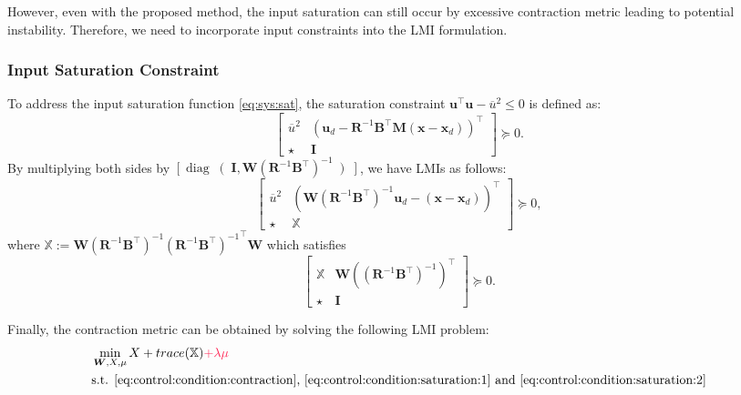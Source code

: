 \documentclass{ifacconf}
\newcommand{\ctxt}[2]{{\color{#1}{#2}\color{black}}}
\newcommand{\cred}[1]{{\ctxt{awesome}{#1}}}
\newcommand*{\mv}[1]{\boldsymbol{#1}} %
\newcommand*{\mm}[1]{\boldsymbol{#1}} %
\DeclareMathOperator{\mydiag}{diag}     %
\begin{document}
However, even with the proposed method, the input saturation can still occur by excessive contraction metric leading to potential instability.
Therefore, we need to incorporate input constraints into the LMI formulation.

\subsubsection{Input Saturation Constraint}

To address the input saturation function \eqref{eq:sys:sat}, the saturation constraint $\mv{u}^\top \mv{u} - \overline{u}^2 \le 0$ is defined as:
\begin{equation}
   \begin{bmatrix}
      \overline{u}^2 & \left(\mv{u}_d - \mm{R}^{-1}\mm{B}^\top\mm{M}(\mv{x}-\mv{x}_d)\right)^\top \\
      \star & \mm{I}
   \end{bmatrix}
   \succeq
   0
   .
\end{equation}
By multiplying both sides by $\left[\mydiag\right(\mm{I},\mm{W}(\mm{R}^{-1}\mm{B}^\top)^{-1}\left)\right]$, we have LMIs as follows:
\begin{equation} \label{eq:control:condition:saturation:1}
   \begin{bmatrix}
      \overline{u}^2 & \left(\mm{W}(\mm{R}^{-1}\mm{B}^\top)^{-1}\mv{u}_d - (\mv{x}-\mv{x}_d)\right)^\top \\
      \star & \mathbb{X}
   \end{bmatrix}
   \succeq
   0
   ,
\end{equation}
where $\mathbb{X}:=\mm{W}(\mm{R}^{-1}\mm{B}^\top)^{-1}{(\mm{R}^{-1}\mm{B}^\top)^{-1}}^\top\mm{W}$ which satisfies
\begin{equation} \label{eq:control:condition:saturation:2}
   \begin{bmatrix}
      \mathbb{X} & \mm{W}((\mm{R}^{-1}\mm{B}^\top)^{-1})^\top \\
      \star & \mm{I}
   \end{bmatrix}
   \succeq
   0
   .
\end{equation}

\hfill

Finally, the contraction metric can be obtained by solving the following LMI problem:
\begin{equation}
   \begin{aligned}
      &\min_{\mm{W},X,\mu} 
         X
         + 
         \rm{trace}(\mm{\mathbb{X}})
         \cred{
            + \lambda \mu
         }
      \\
      &\text{s.t. \eqref{eq:control:condition:contraction}, \eqref{eq:control:condition:saturation:1} and \eqref{eq:control:condition:saturation:2}}
   \end{aligned}
\end{equation}
\end{document}
